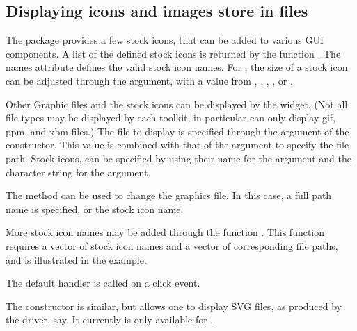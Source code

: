 \subsection{Displaying icons and images store in files}
\label{sec:gWidgets-displ-icons-imag}

The  package provides a few stock icons, that can be
added to various GUI components. A list of the defined stock icons is
returned by the function . The names attribute
defines the valid stock icon names.  For , the size
of a stock icon can be adjusted through the 
argument, with a value from , ,
, , or .

Other Graphic files and the stock icons can be displayed by the
 widget. (Not all file types may be displayed by
each toolkit, in particular  can only display gif,
ppm, and xbm files.)  The file to display is specified through the
 argument of the constructor. This value is
combined with that of the  argument to
specify the file path.  Stock icons, can be specified by using their
name for the  argument and the character string
 for the  argument.



The  method can be used to change the
graphics file. In this case, a full path name is specified, or the
stock icon name.


More stock icon names may be added through the function
. This function requires a vector of stock icon
names and a vector of corresponding file paths, and is illustrated in
the example.

The default handler is called on a click event.

The  constructor is similar, but allows one to
display SVG files, as produced by the  driver, say. It
currently is only available for .

